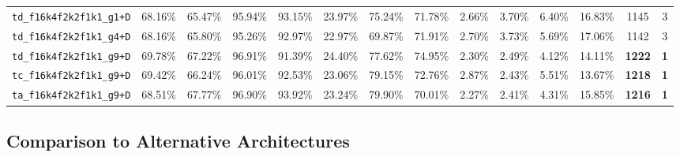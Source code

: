 \documentclass{article}
\begin{document}
\begin{table}[t]
{\begin{minipage}{\linewidth}
{\begin{tabular}{@{}l|ccccccc|cccc|cc@{}}
	\texttt{td\_f16k4f2k2f1k1\_g1+D}               &          68.16\% &          65.47\% &          95.94\% &          93.15\% &          23.97\% &          75.24\% &          71.78\% &           2.66\% &           3.70\% &           6.40\% &          16.83\% &          1145 &           3  \\
	\texttt{td\_f16k4f2k2f1k1\_g4+D}               &          68.16\% &          65.80\% &          95.26\% &          92.97\% &          22.97\% &          69.87\% &          71.91\% &           2.70\% &           3.73\% &           5.69\% &          17.06\% &          1142 &           3  \\
	\texttt{td\_f16k4f2k2f1k1\_g9+D}               &          69.78\% &          67.22\% &          96.91\% &          91.39\% &          24.40\% &          77.62\% &          74.95\% &           2.30\% &           2.49\% &           4.12\% &          14.11\% & \textbf{1222} &  \textbf{1}  \\
	\texttt{tc\_f16k4f2k2f1k1\_g9+D}               &          69.42\% &          66.24\% &          96.01\% &          92.53\% &          23.06\% &          79.15\% &          72.76\% &           2.87\% &           2.43\% &           5.51\% &          13.67\% & \textbf{1218} &  \textbf{1}  \\
	\texttt{ta\_f16k4f2k2f1k1\_g9+D}               &          68.51\% &          67.77\% &          96.90\% &          93.92\% &          23.24\% &          79.90\% &          70.01\% &           2.27\% &           2.41\% &           4.31\% &          15.85\% & \textbf{1216} &  \textbf{1}  \\
    \bottomrule
	\end{tabular}}

    \vspace{1mm}


	\end{minipage}%
	}
\end{table}

\subsection{Comparison to Alternative Architectures}
\end{document}
